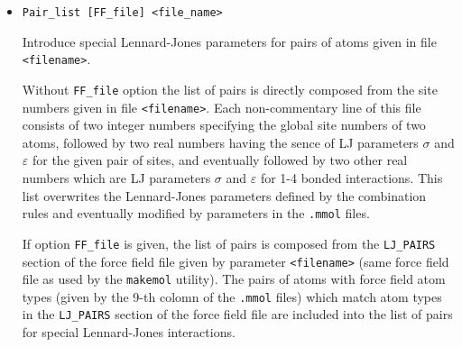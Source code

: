\documentclass{article}
\begin{document}
\begin{itemize}
Use another (than Lorentz-Berthelot) combination rule for Lennard-Jones
parameters for different types

\verb|type| may be one of the following:

\verb|Sigma_geom| 

LJ $\sigma$ parameter is calculated as a geometrical 
average of the both types (as for example in the OPLS force field)
 
\verb|Kong| 

use Kong rules (J.Kong, J.Chem.Phys., 59, 2464, (1973))

\verb|Fender| 

use Fender-Halsey rules ( B. E. F. Fender and G. D. Halsey, Jr. 
"{\it Second Virial Coefficients of Argon, Krypton, and Argon-Krypton 
Mixtures at Low Temperatures}", J. Chem. Phys. 1881 (1962))

\verb|Waldman|
use Waldman-Hagler rules (M. Waldman and A. T. Hagler 
"{\it New combining rules for rare-gas Van der-Waals parameters}", 
Journal of Computational Chemistry 14 pp. 1077-1084 (1993))

\verb|Mixed|
use mixed combination rules from paper: A. Nikitin, Y. Milchevskiy, A. P. Lyubartsev "{\it AMBER-ii: New Combining Rules and Force Field for Perfluoroalkanes"} 
J. Phys. Chem. B, 119, 14563-14573 (2015) 

{\bf Default}: use Lorentz-Berthelot combination rules

\item
\verb|Pair_list [FF_file] <file_name>|

Introduce special Lennard-Jones parameters for pairs of atoms given in
file \verb|<filename>|. 

Without \verb|FF_file| option the list of pairs is directly composed 
from the site numbers given in file \verb|<filename>|. Each non-commentary 
line of this file consists of two integer numbers specifying the global 
site numbers of two atoms, followed by two real numbers having the sence of
LJ parameters $\sigma$ and $\varepsilon$ for the given pair of sites, 
and eventually followed by two other real numbers which are 
LJ parameters $\sigma$ and $\varepsilon$ for 1-4 bonded interactions. 
This list overwrites the Lennard-Jones parameters defined by the combination 
rules and eventually modified by parameters in the \verb|.mmol| files.

If option \verb|FF_file| is given, the list of pairs is composed from 
the \verb|LJ_PAIRS| section of the force field file given by parameter 
\verb|<filename>| (same force field file as used by the \verb|makemol| 
utility). The pairs of atoms with force field atom types (given by the
9-th colomn of the \verb|.mmol| files) which match atom types in the 
\verb|LJ_PAIRS| section of the force field file are included into the list of
pairs for special Lennard-Jones interactions. 


\end{itemize}
\end{document}
